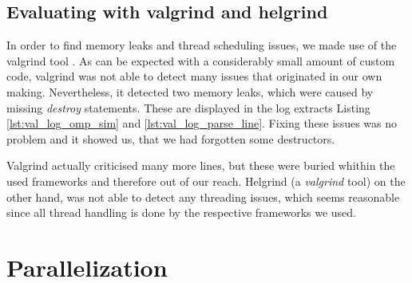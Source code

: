\documentclass[a4paper,11pt]{scrartcl} %
\begin{document}
\subsection{Evaluating with valgrind and helgrind}
In order to find memory leaks and thread scheduling issues, we made use of the valgrind tool \cite{valgrind}. As can be expected with a considerably small amount of custom code, valgrind was not able to detect many issues that originated in our own making. Nevertheless, it detected two memory leaks, which were caused by missing \emph{destroy} statements. These are displayed in the log extracts Listing \ref{lst:val_log_omp_sim} and \ref{lst:val_log_parse_line}.
Fixing these issues was no problem and it showed us, that we had forgotten some destructors.



Valgrind actually criticised many more lines, but these were buried whithin the used frameworks and therefore out of our reach. Helgrind (a \textit{valgrind} tool) on the other hand, was not able to detect any threading issues, which seems reasonable since all thread handling is done by the respective frameworks we used.

\section{Parallelization}
\end{document}
